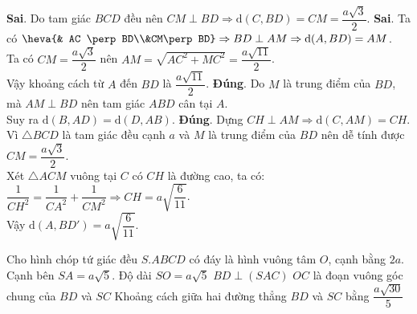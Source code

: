 \begin{vd}
{{}
\begin{itemchoice}
\itemch \textbf{Sai}. Do tam giác $BCD$ đều nên $CM \perp BD \Rightarrow \mathrm{d}(C, BD)=CM=\dfrac{a\sqrt{3}}{2}$.
\itemch \textbf{Sai}. Ta có $\heva{& AC \perp BD\\&CM\perp BD} \Rightarrow BD \perp AM \Rightarrow \mathrm{d}(A, BD)=AM$.\\
Ta có  $CM=\dfrac{a\sqrt{3}}{2}$ nên $AM=\sqrt{AC^2+MC^2}=\dfrac{a\sqrt{11}}{2}$.\\
Vậy khoảng cách từ $A$ đến $BD$ là $\dfrac{a\sqrt{11}}{2}$.
\itemch \textbf{Đúng}. Do $M$ là trung điểm của $BD$, mà $AM \perp BD$ nên tam giác $ABD$ cân tại $A$.\\
Suy ra $\mathrm{d}(B,AD)=\mathrm{d}(D,AB)$.
\itemch \textbf{Đúng}. Dựng $CH \perp AM \Rightarrow \mathrm{d}(C,AM)=CH$.\\
Vì $\triangle BCD$ là tam giác đều cạnh $a$ và $M$ là trung điểm của $BD$ nên dễ tính được $CM=\dfrac{a\sqrt{3}}{2}$.\\
Xét $\triangle ACM$ vuông tại $C$ có $CH$ là đường cao, ta có:\\
$\dfrac{1}{CH^2}=\dfrac{1}{CA^2}+\dfrac{1}{CM^2} \Rightarrow CH=a\sqrt{\dfrac{6}{11}}$.\\
Vậy $\mathrm{d}(A, BD')=a\sqrt{\dfrac{6}{11}}$.

\end{itemchoice}
}
\end{vd}

\begin{vd}%
Cho hình chóp tứ giác đều $S.ABCD$ có đáy là hình vuông tâm $O$, cạnh bằng $2a$. Cạnh bên $SA=a \sqrt{5}$.
\choiceTF
{Độ dài $SO=a \sqrt{5}$}
{\True $BD\perp(SAC)$}
{$OC$ là đoạn vuông góc chung của $BD$ và $SC$}
{\True Khoảng cách giữa hai đường thẳng $BD$ và $SC$ bằng $\dfrac{a \sqrt{30}}{5}$}
\end{vd}

